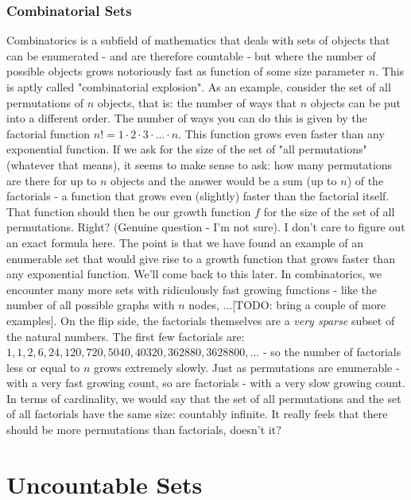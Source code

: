 \documentclass[12pt]{article}
\begin{document}
\subsubsection{Combinatorial Sets}
Combinatorics is a subfield of mathematics that deals with sets of objects that can be enumerated - and are therefore countable - but where the number of possible objects grows notoriously fast as function of some size parameter $n$. This is aptly called "combinatorial explosion". As an example, consider the set of all permutations of $n$ objects, that is: the number of ways that $n$ objects can be put into a different order. The number of ways you can do this is given by the factorial function $n! = 1\cdot 2\cdot 3\cdot \ldots \cdot n$. This function grows even faster than any exponential function. If we ask for the size of the set of "all permutations" (whatever that means), it seems to make sense to ask: how many permutations are there for up to $n$ objects and the answer would be a sum (up to $n$) of the factorials - a function that grows even (slightly) faster than the factorial itself. That function should then be our growth function $f$ for the size of the set of all permutations. Right? (Genuine question - I'm not sure). I don't care to figure out an exact formula here. The point is that we have found an example of an enumerable set that would give rise to a growth function that grows faster than any exponential function. We'll come back to this later. In combinatorics, we encounter many more sets with ridiculously fast growing functions - like the number of all possible graphs with $n$ nodes, ...[TODO: bring a couple of more examples]. On the flip side, the factorials themselves are a \emph{very sparse} subset of the natural numbers. The first few factorials are: $1,1,2,6,24,120,720,5040,40320,362880,3628800,\ldots$ - so the number of factorials less or equal to $n$ grows extremely slowly. Just as permutations are enumerable - with a very fast growing count, so are factorials - with a very slow growing count. In terms of cardinality, we would say that the set of all permutations and the set of all factorials have the same size: countably infinite. It really feels that there should be more permutations than factorials, doesn't it?


\section{Uncountable Sets}
\end{document}
